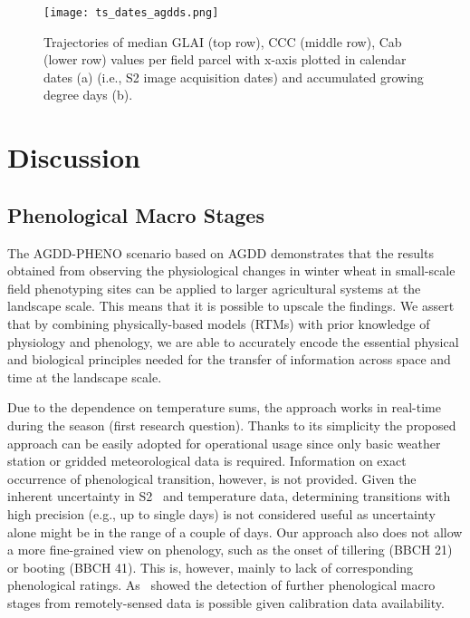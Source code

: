 \begin{figure}[H]
    \centering
    \texttt{[image: ts\_dates\_agdds.png]}
    \caption[Trajectories of median GLAI (top row), CCC (middle row), Cab (lower row) values per field parcel with x-axis plotted in calendar dates (a) (i.e., S2 image acquisition dates) and accumulated growing degree days (b).]{Trajectories of median GLAI (top row), CCC (middle row), Cab (lower row) values per field parcel with x-axis plotted in calendar dates (a) (i.e., S2 image acquisition dates) and accumulated growing degree days (b).}
    \label{fig:ts-dates-agdds}
\end{figure}

\section{Discussion}
\label{sec:discussion}
% 
\subsection{Phenological Macro Stages}
The AGDD-PHENO scenario based on AGDD demonstrates that the results obtained from observing the physiological changes in winter wheat in small-scale field phenotyping sites can be applied to larger agricultural systems at the landscape scale. This means that it is possible to upscale the findings. We assert that by combining physically-based models (RTMs) with prior knowledge of physiology and phenology, we are able to accurately encode the essential physical and biological principles needed for the transfer of information across space and time at the landscape scale.

Due to the dependence on temperature sums, the approach works in real-time during the season (first research question). Thanks to its simplicity the proposed approach can be easily adopted for operational usage since only basic weather station or gridded meteorological data is required. Information on exact occurrence of phenological transition, however, is not provided. Given the inherent uncertainty in S2~\citep{graf_propagating_2023} and temperature data, determining transitions with high precision (e.g., up to single days) is not considered useful as uncertainty alone might be in the range of a couple of days. Our approach also does not allow a more fine-grained view on phenology, such as the onset of tillering (BBCH 21) or booting (BBCH 41). This is, however, mainly to lack of corresponding phenological ratings. As~\citep{liao_near_2023} showed the detection of further phenological macro stages from remotely-sensed data is possible given calibration data availability.

